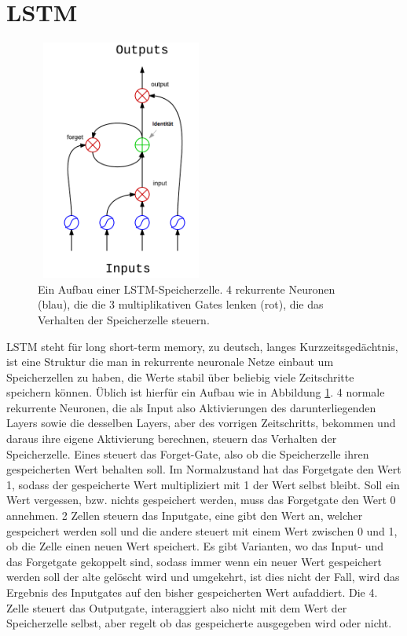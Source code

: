 \section{LSTM}
\begin{figure}
	\centering
	\includegraphics[width=0.5\textwidth, height=300px]{pics/lstm.png}	
	\caption{Ein Aufbau einer LSTM-Speicherzelle. 4 rekurrente Neuronen (blau), die die 3 multiplikativen Gates lenken (rot), die das Verhalten der Speicherzelle steuern.    \cite{bib:lstmpic}}
	\label{img:lstm}
\end{figure}
LSTM steht für long short-term memory, zu deutsch, langes Kurzzeitsgedächtnis, ist eine Struktur die man in rekurrente neuronale Netze einbaut um Speicherzellen zu haben, die Werte stabil über beliebig viele Zeitschritte speichern können. Üblich ist hierfür ein Aufbau wie in Abbildung \ref{img:lstm}. 4 normale rekurrente Neuronen, die als Input also Aktivierungen des darunterliegenden Layers sowie die desselben Layers, aber des vorrigen Zeitschritts, bekommen und daraus ihre eigene Aktivierung berechnen, steuern das Verhalten der Speicherzelle. Eines steuert das Forget-Gate, also ob die Speicherzelle ihren gespeicherten Wert behalten soll. Im Normalzustand hat das Forgetgate den Wert 1, sodass der gespeicherte Wert multipliziert mit 1 der Wert selbst bleibt. Soll ein Wert vergessen, bzw. nichts gespeichert werden, muss das Forgetgate den Wert 0 annehmen. 2 Zellen steuern das Inputgate, eine gibt den Wert an, welcher gespeichert werden soll und die andere steuert mit einem Wert zwischen 0 und 1, ob die Zelle einen neuen Wert speichert. Es gibt Varianten, wo das Input- und das Forgetgate gekoppelt sind, sodass immer wenn ein neuer Wert gespeichert werden soll der alte gelöscht wird und umgekehrt, ist dies nicht der Fall, wird das Ergebnis des Inputgates auf den bisher gespeicherten Wert aufaddiert. Die 4. Zelle steuert das Outputgate, interaggiert also nicht mit dem Wert der Speicherzelle selbst, aber regelt ob das gespeicherte ausgegeben wird oder nicht. \cite{bib:lstm}

